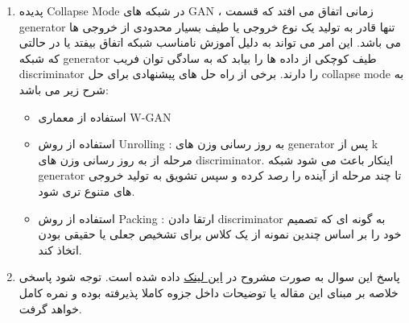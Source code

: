 \begin{enumerate}[label=(\alph*)]
	
	\item
	
	پدیده Collapse Mode در شبکه های GAN ، زمانی اتفاق می افتد که قسمت generator تنها قادر به تولید یک نوع خروجی یا طیف بسیار محدودی از خروجی ها می باشد. این امر می تواند به دلیل آموزش نامناسب شبکه اتفاق بیفتد یا در حالتی که شبکه generator طیف کوچکی از داده ها را بیابد که به سادگی توان فریب discriminator را دارند. 
	برخی از راه حل های پیشنهادی برای حل collapse mode به شرح زیر می باشد:
	
	\begin{itemize}
		
		\item
		استفاده از معماری W-GAN 
		\item
		استفاده از روش Unrolling : به روز رسانی وزن های generator پس از k مرحله از به روز رسانی وزن های discriminator. اینکار باعث می شود شبکه generator تا چند مرحله از آینده را رصد کرده و سپس تشویق به تولید خروجی های متنوع تری شود.
		\item
	استفاده از روش Packing : ارتقا دادن discriminator به گونه ای که تصمیم خود را بر اساس چندین نمونه از یک کلاس برای تشخیص جعلی یا حقیقی بودن اتخاذ کند.
		
		
	\end{itemize}


	\item
	
	پاسخ این سوال به صورت مشروح در
	\href{https://arxiv.org/pdf/1701.07875.pdf}{این لینک}
	داده شده است. توجه شود پاسخی خلاصه بر مبنای این مقاله یا توضیحات داخل جزوه کاملا پذیرفته بوده و نمره کامل خواهد گرفت.
	
\end{enumerate}